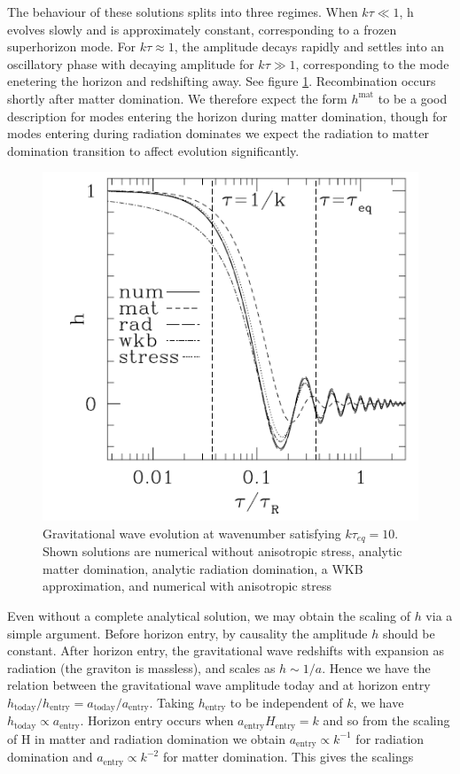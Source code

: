 \documentclass[a4paper,10pt]{article}
\begin{document}
The behaviour of these solutions splits into three regimes. When $k\tau\ll 1$, h evolves slowly and is approximately constant, corresponding to a frozen superhorizon mode. For $k\tau\approx1$, the amplitude decays rapidly and settles into an oscillatory phase with decaying amplitude for $k\tau \gg 1$, corresponding to the mode enetering the horizon and redshifting away. See figure \ref{gravwave}. Recombination occurs shortly after matter domination. We therefore expect the form $h^{\text{mat}}$ to be a good description for modes entering the horizon during matter domination, though for modes entering during radiation dominates we expect the radiation to matter domination transition to affect evolution significantly.\\

\begin{figure}[h]
  \includegraphics[width=0.5\linewidth]{gravwaveev.png}
  \centering
  \caption{Gravitational wave evolution at wavenumber satisfying $k\tau_{eq}=10$. Shown solutions are numerical without anisotropic stress, analytic matter domination, analytic radiation domination, a WKB approximation, and numerical with anisotropic stress}
  \label{gravwave}
\end{figure}

Even without a complete analytical solution, we may obtain the scaling of $h$ via a simple argument. Before horizon entry,  by causality the amplitude $h$ should be constant. After horizon entry, the gravitational wave redshifts with expansion as radiation (the graviton is massless), and scales as $h\sim 1/a$. Hence we have the relation between the gravitational wave amplitude today and at horizon entry $h_{\text{today}}/h_{\text{entry}} = a_{\text{today}}/a_{\text{entry}}$. Taking $h_{\text{entry}}$ to be independent of $k$, we have $h_{\text{today}}\propto a_{\text{entry}}$. Horizon entry occurs when $a_{\text{entry}}H_{\text{entry}}=k$ and so from the scaling of H in matter and radiation domination we obtain $a_{\text{entry}}\propto k^{-1}$ for radiation domination and $a_{\text{entry}}\propto k^{-2}$ for matter domination. This gives the scalings
\end{document}
